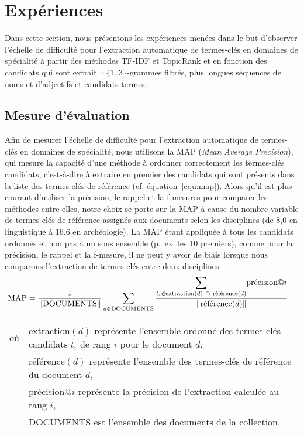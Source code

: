 \section{Expériences}
\label{sec:experiences}
  Dans cette section, nous présentons les expériences menées dans le but
  d'observer l'échelle de difficulté pour l'extraction automatique de
  termes-clés en domaines de spécialité à partir des méthodes TF-IDF et
  TopicRank et en fonction des candidats qui sont extrait~: $\{1..3\}$-grammes
  filtrés, plus longues séquences de noms et d'adjectifs et candidats termes.

  \subsection{Mesure d'évaluation}
  \label{subsec:mesure_d_evaluation}
    Afin de mesurer l'échelle de difficulté pour l'extraction automatique de
    termes-clés en domaines de spécialité, nous utilisons la MAP (\textit{Mean
    Average Precision}), qui mesure la capacité d'une méthode à ordonner
    correctement les termes-clés candidats, c'est-à-dire à extraire en premier des
    candidats qui sont présents dans la liste des termes-clés de référence (cf.
    équation~\ref{equ:map}). Alors qu'il est plus courant d'utiliser la
    précision, le rappel et la f-mesures pour comparer les méthodes entre elles,
    notre choix se porte sur la MAP à cause du nombre variable de termes-clés de
    référence assignés aux documents selon les disciplines (de 8,0 en
    linguistique à 16,6 en archéologie). La MAP étant appliquée à tous les
    candidats ordonnés et non pas à un sous ensemble (p.~ex. les 10 premiers),
    comme pour la précision, le rappel et la f-mesure, il ne peut y avoir de
    biais lorsque nous comparons l'extraction de termes-clés entre deux
    disciplines.
    \begin{align}
      \text{MAP} &= \frac{1}{\|\text{DOCUMENTS}\|} \sum_{d \in \text{DOCUMENTS}} \frac{\mathlarger\sum_{t_i \in \text{extraction}(d)~\cap~\text{référence}(d)} \text{précision}@i}{\|\text{référence}(d)\|} \label{equ:map}
    \end{align}
    \hfill\begin{minipage}{.96\linewidth}
      \begin{tabular}{@{}l@{~~-~~}p{.9\linewidth}@{}}
        où & extraction$(d)$ représente l'ensemble ordonné des termes-clés
             candidats $t_i$ de rang $i$ pour le document $d$,\\
           & référence$(d)$ représente l'ensemble des termes-clés de référence
             du document $d$,\\
           & précision$@i$ représente la précision de l'extraction calculée au
             rang $i$,\\
           & DOCUMENTS est l'ensemble des documents de la collection. \\
      \end{tabular}
    \end{minipage}\hfill
    
